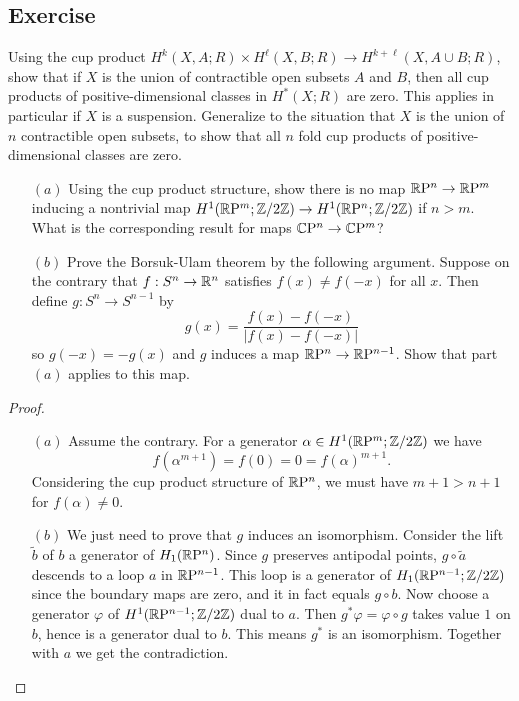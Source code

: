 \subsection{Exercise}
\begin{exercise}
Using the cup product $H^k(X,A;R)\times H^\ell(X,B;R)\to H^{k+\ell}(X,A\cup B;R)$, show that if $X$ is the union of contractible open subsets $A$ and $B$, then all cup products of positive-dimensional classes in $H^*(X;R)$ are zero. This applies in particular if $X$ is a suspension. Generalize to the situation that $X$ is the union of $n$ contractible open subsets, to show that all $n$ fold cup products of positive-dimensional classes are zero.
\end{exercise}
\begin{exercise}
\mbox{}
\begin{itemize}
\item[$(a)$]Using the cup product structure, show there is no map $\mathbb{R}\mathrm{P}^n\to\mathbb{R}\mathrm{P}^m$ inducing a nontrivial map $H^1(\mathbb{R}\mathrm{P}^m;\mathbb{Z}/2\mathbb{Z})\to H^1(\mathbb{R}\mathrm{P}^n;\mathbb{Z}/2\mathbb{Z})$ if $n>m$. What is the corresponding result for maps $\mathbb{C}\mathrm{P}^n\to\mathbb{C}\mathrm{P}^m$?
\item[$(b)$]Prove the Borsuk-Ulam theorem by the following argument. Suppose on the contrary that $f:S^n\to\mathbb{R}^n$ satisfies $f(x)\neq f(-x)$ for all $x$. Then define $g:S^n\to S^{n-1}$ by 
\[g(x)=\frac{f(x)-f(-x)}{|f(x)-f(-x)|}\]
so $g(-x)=-g(x)$ and $g$ induces a map $\mathbb{R}\mathrm{P}^n\to\mathbb{R}\mathrm{P}^{n-1}$. Show that part $(a)$ applies to this map.
\end{itemize}
\end{exercise}
\begin{proof}
\mbox{}
\begin{itemize}
\item[$(a)$]Assume the contrary. For a generator $\alpha\in H^1(\mathbb{R}\mathrm{P}^m;\mathbb{Z}/2\mathbb{Z})$ we have
\[f(\alpha^{m+1})=f(0)=0=f(\alpha)^{m+1}.\]
Considering the cup product structure of $\mathbb{R}\mathrm{P}^n$, we must have $m+1>n+1$ for $f(\alpha)\neq 0$.
\item[$(b)$]We just need to prove that $g$ induces an isomorphism. Consider the lift $\widetilde{b}$ of $b$ a generator of $H_1(\mathbb{R}\mathrm{P}^n)$. Since $g$ preserves antipodal points, $g\circ\widetilde{a}$ descends to a loop $a$ in $\mathbb{R}\mathrm{P}^{n-1}$. This loop is a generator of $H_1(\mathbb{R}\mathrm{P}^{n-1};\mathbb{Z}/2\mathbb{Z})$ since the boundary maps are zero, and it in fact equals $g\circ b$. Now choose a generator $\varphi$ of $H^1(\mathbb{R}\mathrm{P}^{n-1};\mathbb{Z}/2\mathbb{Z})$ dual to $a$. Then $g^*\varphi=\varphi\circ g$ takes value $1$ on $b$, hence is a generator dual to $b$. This means $g^*$ is an isomorphism. Together with $a$ we get the contradiction.
\end{itemize}
\end{proof}
